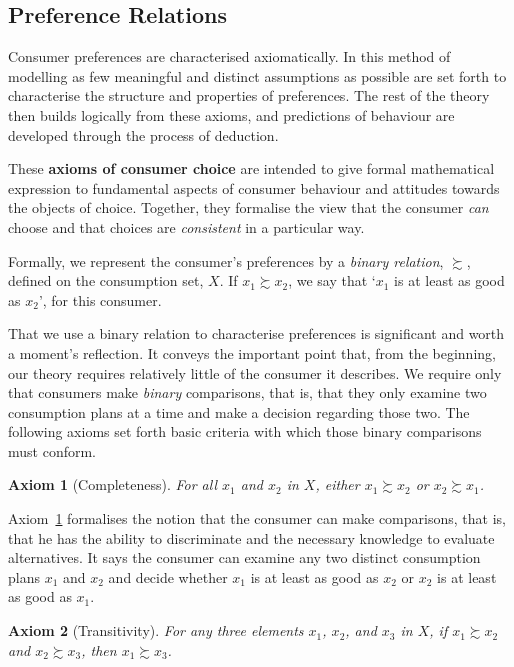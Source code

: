 \documentclass[b5paper]{memoir}
\newtheorem{axiom}{Axiom}
\let\markupwd\textbf
\begin{document}
\subsection{Preference Relations}

Consumer preferences are characterised axiomatically. In this method of modelling as few
meaningful and distinct assumptions as possible are set forth to characterise the
structure and properties of preferences. The rest of the theory then builds logically from
these axioms, and predictions of behaviour are developed through the process of deduction.

These \markupwd{axioms of consumer choice} are intended to give formal mathematical
expression to fundamental aspects of consumer behaviour and attitudes towards the objects
of choice. Together, they formalise the view that the consumer \emph{can} choose and that
choices are \emph{consistent} in a particular way.

Formally, we represent the consumer’s preferences by a \emph{binary relation}, $\succsim$,
defined on the consumption set, $X$. If $x_1 \succsim x_2$, we say that ‘$x_1$ is at least
as good as $x_2$’, for this consumer.

That we use a binary relation to characterise preferences is significant and worth a
moment’s reflection. It conveys the important point that, from the beginning, our theory
requires relatively little of the consumer it describes. We require only that consumers
make \emph{binary} comparisons, that is, that they only examine two consumption plans at a
time and make a decision regarding those two. The following axioms set forth basic
criteria with which those binary comparisons must conform.

\begin{axiom}[Completeness] \label{ax:1}
For all $x_1$ and $x_2$ in $X$, either $x_1 \succsim x_2$ or $x_2 \succsim x_1$.
\end{axiom}

Axiom~\ref{ax:1} formalises the notion that the consumer can make comparisons, that is,
that he has the ability to discriminate and the necessary knowledge to evaluate
alternatives. It says the consumer can examine any two distinct consumption plans $x_1$
and $x_2$ and decide whether $x_1$ is at least as good as $x_2$ or $x_2$ is at least as
good as $x_1$.

\begin{axiom}[Transitivity] \label{ax:2}
For any three elements $x_1$, $x_2$, and $x_3$ in $X$, if $x_1 \succsim x_2$ and $x_2
\succsim x_3$, then $x_1 \succsim x_3$.
\end{axiom}
\end{document}
